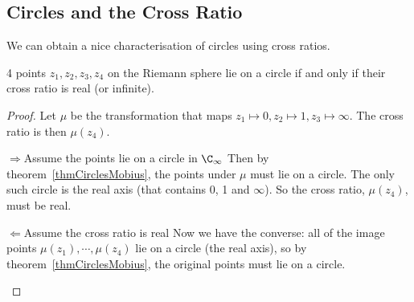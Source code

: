 \documentclass[../Main.tex]{subfiles}
\begin{document}
\subsection{Circles and the Cross Ratio}
We can obtain a nice characterisation of circles using cross ratios.
\begin{proposition}
    4 points $z_1, z_2, z_3, z_4$ on the Riemann sphere lie on a circle if and only if their cross ratio is real (or infinite).
\end{proposition}
\begin{proof}
    Let $\mu$ be the transformation that maps $z_1 \mapsto 0, z_2 \mapsto 1, z_3 \mapsto \infty$. The cross ratio is then $\mu(z_4)$.
    \begin{proofdirection}{$\Rightarrow$}{Assume the points lie on a circle in $\CInf$}
        Then by theorem~\ref{thmCirclesMobius}, the points under $\mu$ must lie on a circle. The only such circle is the real axis (that contains 0, 1 and $\infty$). So the cross ratio, $\mu(z_4)$, must be real.
    \end{proofdirection}
    \begin{proofdirection}{$\Leftarrow$}{Assume the cross ratio is real}
        Now we have the converse: all of the image points $\mu(z_1), \cdots, \mu(z_4)$ lie on a circle (the real axis), so by theorem~\ref{thmCirclesMobius}, the original points must lie on a circle.
    \end{proofdirection}
\end{proof}
\end{document}
